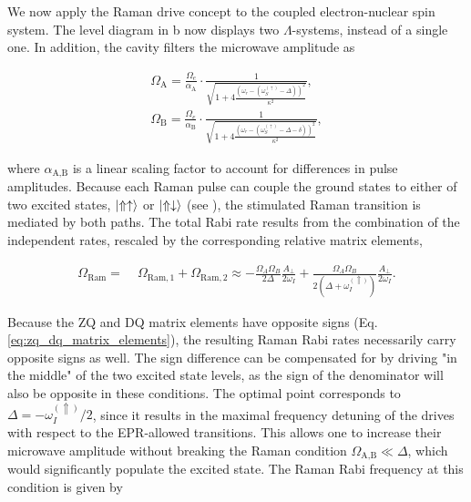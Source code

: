 We now apply the Raman drive concept to the coupled electron-nuclear spin system. The level diagram in b now displays two $\Lambda$-systems, instead of a single one. In addition, the cavity filters the microwave amplitude as

\begin{equation}
\begin{split}
    \Omega_\text{A} = \frac{\Omega_{e}}{\alpha_\text{A}} \cdot \frac{1}{\sqrt{1 + 4\frac{(\omega_r-(\omega_S^{(\uparrow)}-\Delta))^2}{\kappa^2}}}, \\
    \Omega_\text{B} = \frac{\Omega_{e}}{\alpha_\text{B}} \cdot \frac{1}{\sqrt{1 + 4\frac{(\omega_r-(\omega_S^{(\uparrow)}-\Delta-\delta))^2}{\kappa^2}}},
\end{split}
\label{raman_amplitudes}
\end{equation}

where $\alpha_\text{A,B}$ is a linear scaling factor to account for differences in pulse amplitudes. Because each Raman pulse can couple the ground states to either of two excited states, $\ket{\Uparrow\uparrow}$ or $\ket{\Uparrow\downarrow}$ (see ), the stimulated Raman transition is mediated by both paths. The total Rabi rate results from the combination of the independent rates, rescaled by the corresponding relative matrix elements,

\begin{equation}
\begin{split}    
    \Omega_{\mathrm{Ram}} =&\; \Omega_{\mathrm{Ram},1} +\Omega_{\mathrm{Ram},2}  \approx -\frac{\Omega_A\Omega_B}{2\Delta} \frac{A_\perp}{2\omega_I} + \frac{\Omega_A\Omega_B}{2(\Delta + \omega_I^{(\Uparrow)})} \frac{A_\perp}{2\omega_I}.
\end{split}
\label{eq:omega_raman}
\end{equation}

Because the ZQ and DQ matrix elements have opposite signs (Eq. \ref{eq:zq_dq_matrix_elements}), the resulting Raman Rabi rates necessarily carry opposite signs as well. The sign difference can be compensated for by driving "in the middle" of the two excited state levels, as the sign of the denominator will also be opposite in these conditions. The optimal point corresponds to $\Delta=-\omega_I^{(\Uparrow)}/2$, since it results in the maximal frequency detuning of the drives with respect to the EPR-allowed transitions. This allows one to increase their microwave amplitude without breaking the Raman condition $\Omega_\text{A,B} \ll \Delta$, which would significantly populate the \Er excited state. The Raman Rabi frequency at this condition is given by

